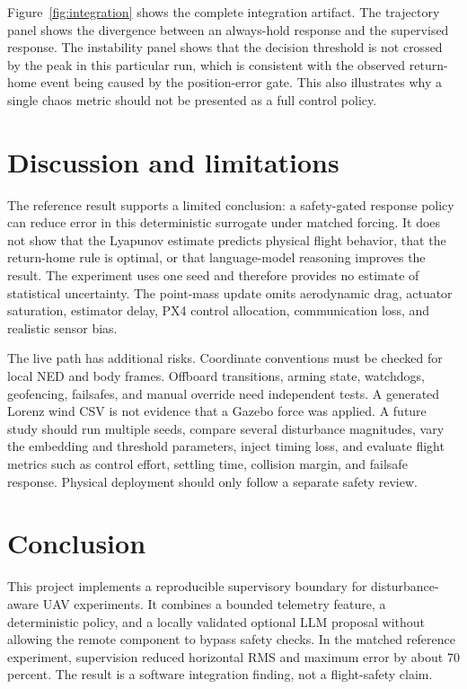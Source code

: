 \documentclass[11pt,a4paper,twocolumn]{article}
\begin{document}
Figure~\ref{fig:integration} shows the complete integration artifact. The
trajectory panel shows the divergence between an always-hold response and the
supervised response. The instability panel shows that the decision threshold
is not crossed by the peak in this particular run, which is consistent with
the observed return-home event being caused by the position-error gate. This
also illustrates why a single chaos metric should not be presented as a full
control policy.

\section{Discussion and limitations}
The reference result supports a limited conclusion: a safety-gated response
policy can reduce error in this deterministic surrogate under matched forcing.
It does not show that the Lyapunov estimate predicts physical flight behavior,
that the return-home rule is optimal, or that language-model reasoning improves
the result. The experiment uses one seed and therefore provides no estimate of
statistical uncertainty. The point-mass update omits aerodynamic drag,
actuator saturation, estimator delay, PX4 control allocation, communication
loss, and realistic sensor bias.

The live path has additional risks. Coordinate conventions must be checked for
local NED and body frames. Offboard transitions, arming state, watchdogs,
geofencing, failsafes, and manual override need independent tests. A generated
Lorenz wind CSV is not evidence that a Gazebo force was applied. A future study
should run multiple seeds, compare several disturbance magnitudes, vary the
embedding and threshold parameters, inject timing loss, and evaluate flight
metrics such as control effort, settling time, collision margin, and failsafe
response. Physical deployment should only follow a separate safety review.

\section{Conclusion}
This project implements a reproducible supervisory boundary for disturbance-aware
UAV experiments. It combines a bounded telemetry feature, a deterministic
policy, and a locally validated optional LLM proposal without allowing the
remote component to bypass safety checks. In the matched reference experiment,
supervision reduced horizontal RMS and maximum error by about 70 percent. The
result is a software integration finding, not a flight-safety claim.
\end{document}
